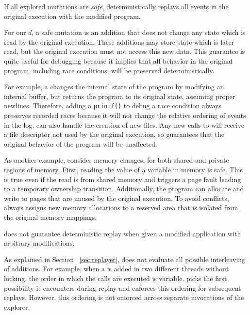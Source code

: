 \begin{property}
	If all explored mutations are \emph{safe}, {\dora}
        deterministically replays all events in the original execution
        with the modified program. 
\end{property}
	For our $d$, a safe mutation is an addition that does not change
	any state which is read by the original execution. These additions may store
	state which is later read, but the original execution must not access this
	new data. This guarantee is quite useful for
	debugging because it implies that all behavior in the original program,
	including race conditions, will be preserved deterministically.

	For example, a  changes the internal state
	of the program by modifying an internal buffer, but returns the program to
	its original state, assuming proper newlines. Therefore, adding a {\tt printf()} to
	debug a race condition always preserves recorded races because
	it will not change the relative ordering of events in the
	log. {\dora} can also handle the creation of new files. Any new calls to
	 will receive a file descriptor not used by the original execution,
	so {\dora} guarantees that the original behavior of the program will be
	unaffected.

	As another example, consider memory changes, for both shared and private
	regions of memory. First, reading the value of a variable in memory is safe.
	This is true even if the read is from shared memory and triggers a page fault
	leading to a temporary ownership transition. Additionally, the program can
	allocate and write to pages that are unused by the original
	execution. To avoid conflicts, {\dora} always assigns new memory
	allocations to a reserved area that is isolated from the original memory mappings.

\begin{property}
	{\dora} does not guarantee deterministic replay when given a modified application
	with arbitrary modifications.
\end{property}
	As explained in Section ~\ref{sec:replayer}, {\dora} does not evaluate
	all possible interleaving of additions.
	For example, when a  is added in two different
	threads without locking, the order in which the calls are executed is
	variable. {\dora}
	picks the first possibility it encounters during replay and enforces this
	ordering for subsequent replays. However, this ordering is not enforced
	across separate invocations of the explorer.

